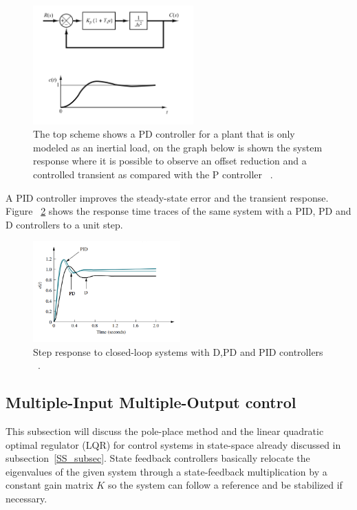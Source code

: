 \begin{figure}[h]
	\centering
	\includegraphics[width=0.55\textwidth]{Chp2/propderivgain.png}
	\caption{ The top scheme shows a PD controller for a  plant that is only modeled as an inertial load, on the graph below is shown the system response where it is possible to observe an offset reduction and a controlled transient as compared with the P controller ~\cite[Chapter~ 5]{Ogata2009}. \label{propderGain}}
\end{figure}

A PID controller improves the steady-state error and the transient response. Figure ~\ref{PID} shows the response time traces  of the same system with a PID, PD and D controllers to a unit step.
\smallskip



\begin{figure}[h]
	\centering
	\includegraphics[width=0.505\textwidth]{Chp2/PID_comp.png}
	\caption{ Step response to closed-loop systems with D,PD and PID controllers ~\cite[Chapter~ 9]{Nise}. \label{PID}}
\end{figure}

\subsection{Multiple-Input Multiple-Output control}

This subsection will discuss the pole-place method and the linear quadratic optimal regulator (LQR) for control systems in state-space already discussed in subsection~\ref{SS_subsec}.  State feedback controllers basically relocate the eigenvalues of the given system through a state-feedback multiplication by a constant gain matrix $K$ so the system can follow a reference and be stabilized if necessary.
 \smallskip
 
